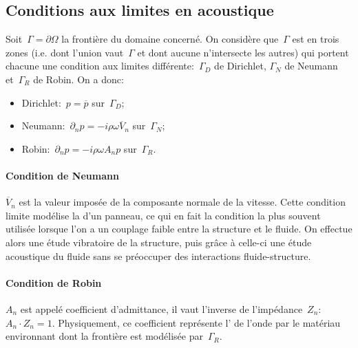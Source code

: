 \subsection{Conditions aux limites en acoustique}
Soit~$\Gamma=\partial\Omega$ la frontière du domaine concerné. On considère que~$\Gamma$ est  en trois zones (i.e. dont l'union vaut~$\Gamma$ et dont aucune n'intersecte les autres) qui portent chacune une condition aux limites différente:~$\Gamma_D$ de Dirichlet, $\Gamma_N$ de Neumann et~$\Gamma_R$ de Robin.
\medskipvm
On a donc:
\begin{itemize}
  \item Dirichlet:~$p=\overline{p}$ sur~$\Gamma_D$;\\[-2ex]
  \item Neumann:~$\partial_n p = -i\rho\omega \overline{V}_n$ sur~$\Gamma_N$;\\[-2ex]
  \item Robin:~$\partial_n p=-i\rho\omega A_n p$ sur~$\Gamma_R$.
\end{itemize}
\medskipvm{}
\paragraph{Condition de Neumann}
$\overline{V}_n$ est la valeur imposée de la composante normale de la vitesse. Cette condition limite modélise la  d'un panneau, ce qui en fait la condition la plus souvent utilisée lorsque l'on a un couplage faible entre la structure et le fluide. On effectue alors une étude vibratoire de la structure, puis grâce à celle-ci une étude acoustique du fluide sans se préoccuper des interactions fluide-structure.

\medskip
\paragraph{Condition de Robin}
$A_n$ est appelé coefficient d'admittance, il vaut l'inverse de l'impédance~$Z_n$:
$A_n\cdot Z_n=1$. Physiquement, ce coefficient représente l' de l'onde par le matériau environnant dont la frontière est modélisée par~$\Gamma_R$.

\medskip
